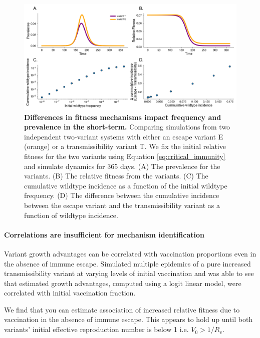 \documentclass[12pt,oneside,letterpaper]{article}
\begin{document}
\begin{figure}[h]
    \centering
    \includegraphics[width=0.8\linewidth]{./figures/short_term_divergence.png}
    \caption{\textbf{Differences in fitness mechanisms impact frequency and prevalence in the short-term.}
    Comparing simulations from two independent two-variant systems with either an escape variant E (orange) or a transmissibility variant T.
    We fix the initial relative fitness for the two variants using Equation \ref{eq:critical_immunity} and simulate dynamics for 365 days.
    (A) The prevalence for the variants.
    (B) The relative fitness from the variants.
    (C) The cumulative wildtype incidence as a function of the initial wildtype frequency.
    (D) The difference between the cumulative incidence between the escape variant and the transmissibility variant as a function of wildtype incidence.
    }%
    \label{fig:short_term_divergence}
\end{figure}

\paragraph{Correlations are insufficient for mechanism identification}%

Variant growth advantages can be correlated with vaccination proportions even in the absence of immune escape.
Simulated multiple epidemics of a pure increased transmissibility variant at varying levels of initial vaccination and was able to see that estimated growth advantages, computed using a logit linear model, were correlated with initial vaccination fraction.

We find that you can estimate association of increased relative fitness due to vaccination in the absence of immune escape.
This appears to hold up until both variants' initial effective reproduction number is below 1 i.e. $V_{0} > 1 / R_{v}$.
\end{document}
